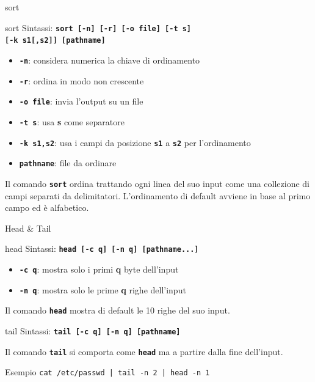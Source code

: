 \documentclass{beamer}
\begin{document}
    \begin{frame}{sort}
        \begin{block}{sort}
            Sintassi: \texttt{\textbf{sort [-n] [-r] [-o file] [-t s]}} \\
            \texttt{\textbf{[-k s1[,s2]] [pathname]}}

            \begin{itemize}
                \item \texttt{\textbf{-n}}: considera numerica la chiave di ordinamento
                \item \texttt{\textbf{-r}}: ordina in modo non crescente
                \item \texttt{\textbf{-o file}}: invia l'output su un file
                \item \texttt{\textbf{-t s}}: usa \textbf{s} come separatore
                \item \texttt{\textbf{-k s1,s2}}: usa i campi da posizione \texttt{\textbf{s1}} a \texttt{\textbf{s2}} per l'ordinamento
                \item \texttt{\textbf{pathname}}: file da ordinare
            \end{itemize}

            Il comando \texttt{\textbf{sort}} ordina trattando ogni linea del suo input come una
            collezione di campi separati da delimitatori.
            L’ordinamento di default avviene in base al primo campo ed è alfabetico.
        \end{block}
    \end{frame}

    \begin{frame}{Head \& Tail}
        \begin{block}{head}
            Sintassi: \texttt{\textbf{head [-c q] [-n q] [pathname...]}}

            \begin{itemize}
                \item \texttt{\textbf{-c q}}: mostra solo i primi \textbf{q} byte dell'input
                \item \texttt{\textbf{-n q}}: mostra solo le prime \textbf{q} righe dell'input
            \end{itemize}

            Il comando \texttt{\textbf{head}} mostra di default le 10 righe del suo input.
        \end{block}

        \begin{block}{tail}
            Sintassi: \texttt{\textbf{tail [-c q] [-n q] [pathname]}}

            Il comando \texttt{\textbf{tail}} si comporta come \texttt{\textbf{head}} ma
            a partire dalla fine dell'input.
        \end{block}

        \begin{exampleblock}{Esempio}
            \texttt{cat /etc/passwd | tail -n 2 | head -n 1}
        \end{exampleblock}
    \end{frame}
\end{document}
